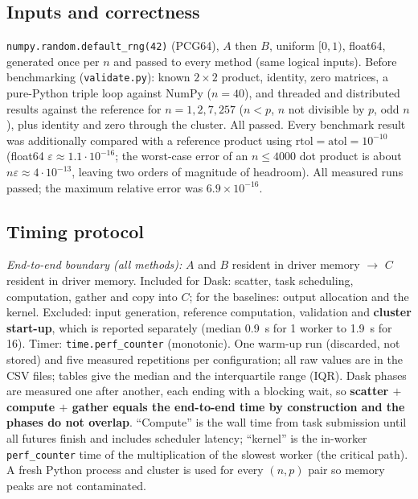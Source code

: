 \documentclass[10pt,a4paper]{article}
\begin{document}
\subsection{Inputs and correctness}
\texttt{numpy.random.default\_rng(42)} (PCG64), $A$ then $B$, uniform $[0,1)$, float64, generated once per $n$ and passed to every method (same logical inputs).
Before benchmarking (\texttt{validate.py}): known $2\times2$ product, identity, zero matrices, a pure-Python triple loop against NumPy ($n=40$), and threaded and distributed results against the reference for $n=1,2,7,257$ ($n<p$, $n$ not divisible by $p$, odd $n$), plus identity and zero through the cluster. All passed.
Every benchmark result was additionally compared with a reference product using $\mathrm{rtol}=\mathrm{atol}=10^{-10}$ (float64 $\varepsilon\approx1.1\cdot10^{-16}$; the worst-case error of an $n\le4000$ dot product is about $n\varepsilon\approx4\cdot10^{-13}$, leaving two orders of magnitude of headroom). All measured runs passed; the maximum relative error was $6.9\times10^{-16}$.

\subsection{Timing protocol}
\emph{End-to-end boundary (all methods):} $A$ and $B$ resident in driver memory $\rightarrow$ $C$ resident in driver memory. Included for Dask: scatter, task scheduling, computation, gather and copy into $C$; for the baselines: output allocation and the kernel. Excluded: input generation, reference computation, validation and \textbf{cluster start-up}, which is reported separately (median 0.9~s for 1 worker to 1.9~s for 16).
Timer: \texttt{time.perf\_counter} (monotonic). One warm-up run (discarded, not stored) and five measured repetitions per configuration; all raw values are in the CSV files; tables give the median and the interquartile range (IQR).
Dask phases are measured one after another, each ending with a blocking wait, so \textbf{scatter $+$ compute $+$ gather equals the end-to-end time by construction and the phases do not overlap}. ``Compute'' is the wall time from task submission until all futures finish and includes scheduler latency; ``kernel'' is the in-worker \texttt{perf\_counter} time of the multiplication of the slowest worker (the critical path). A fresh Python process and cluster is used for every $(n,p)$ pair so memory peaks are not contaminated.
\end{document}
